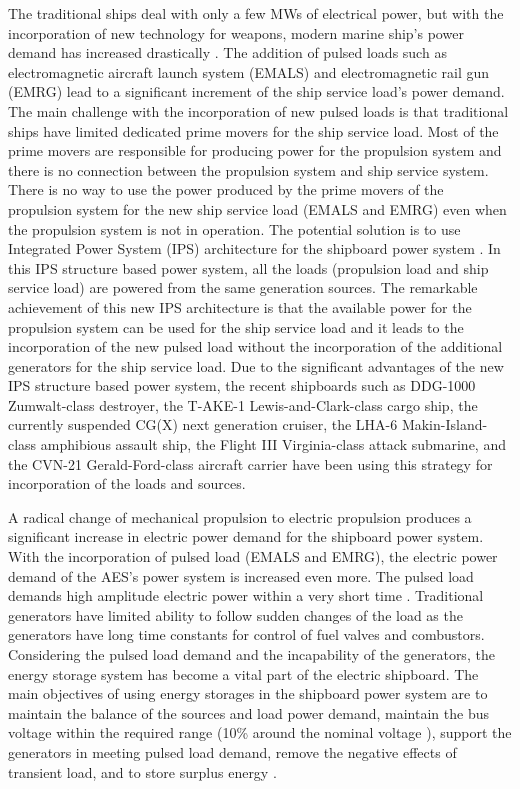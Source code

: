 The traditional ships deal with only a few MWs of electrical power, but with the incorporation of new technology for weapons, modern marine ship's power demand has increased drastically \cite{shen2012distributed}. The addition of pulsed loads such as electromagnetic aircraft launch system (EMALS) and electromagnetic rail gun (EMRG) lead to a significant increment of the ship service load's power demand. The main challenge with the incorporation of new pulsed loads is that traditional ships have limited dedicated prime movers for the ship service load. Most of the prime movers are responsible for producing power for the propulsion system and there is no connection between the propulsion system and ship service system. There is no way to use the power produced by the prime movers of the propulsion system for the new ship service load (EMALS and EMRG) even when the propulsion system is not in operation. The potential solution is to use  Integrated Power System (IPS) architecture for the shipboard power system \cite{shen2012distributed}. In this IPS structure based power system, all the loads (propulsion load and ship service load) are powered from the same generation sources. The remarkable achievement of this new IPS architecture is that the available power for the propulsion system can be used for the ship service load and it leads to the incorporation of the new pulsed load without the incorporation of the additional generators for the ship service load. Due to the significant advantages of the new IPS structure  based power system, the recent shipboards  such as  DDG-1000 Zumwalt-class destroyer, the T-AKE-1 Lewis-and-Clark-class cargo ship, the currently suspended CG(X) next generation cruiser, the LHA-6 Makin-Island-class amphibious assault ship, the Flight III Virginia-class attack submarine, and the CVN-21 Gerald-Ford-class aircraft carrier \cite{doerry2009next, pifer2010modeling} have been using this strategy for incorporation of the loads and sources.


A radical change of mechanical propulsion to electric propulsion produces a significant increase in electric power demand for the shipboard power system. With the incorporation of pulsed load (EMALS and EMRG), the electric power demand of the AES's power system is increased even more. The pulsed load demands high amplitude electric power within a very short time \cite{monti2008energy}. Traditional generators have limited ability to follow sudden changes of the load as the generators have long time constants for control of fuel valves and combustors. Considering the pulsed load demand and the incapability of the generators, the energy storage system has become a vital part of the electric shipboard. The main objectives of using energy storages in the shipboard power system are to maintain the balance of the sources and load power demand, maintain the bus voltage within the required range (10\% around the nominal voltage \cite{mystandard}), support the generators in meeting pulsed load demand, remove the negative effects of transient load, and to store surplus energy \cite{yfuzzy2016, mskhanhybrid2016, khan2017fuzzy, mskhanests2017}. 



